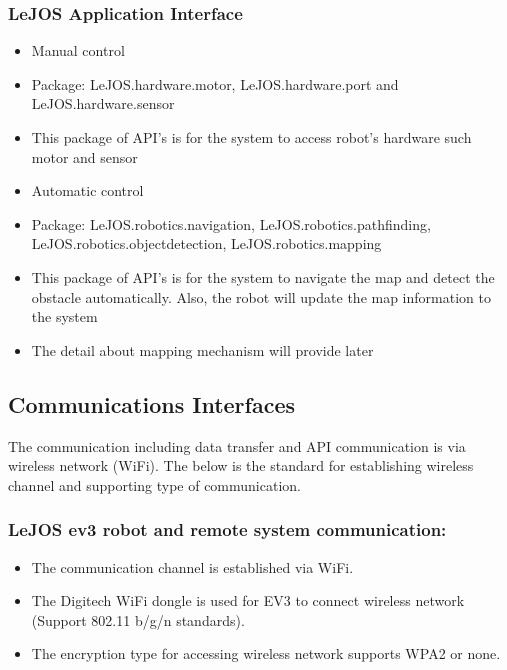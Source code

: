 \documentclass[10pt,a4paper,titlepage]{article}
\begin{document}
	\subsubsection*{LeJOS Application Interface}
	\begin{itemize}
		\item Manual control
		\item Package: LeJOS.hardware.motor, LeJOS.hardware.port and LeJOS.hardware.sensor
		\item This package of API's is for the system to access robot’s hardware such motor and sensor
		\item Automatic control
		\item Package: LeJOS.robotics.navigation, LeJOS.robotics.pathfinding, LeJOS.robotics.objectdetection, LeJOS.robotics.mapping
		\item This package of API's is for the system to navigate the map and detect the obstacle automatically. Also, the robot will update the map information to the system
		\item The detail about mapping mechanism will provide later
	\end{itemize} 
	
	\subsection{Communications Interfaces}
	The communication including data transfer and API communication is via wireless network (WiFi). The below is the standard for establishing wireless channel and supporting type of communication.
	
	\subsubsection*{LeJOS ev3 robot and remote system communication:}
	\begin{itemize}
		\item The communication channel is established via WiFi.
		\item The Digitech WiFi dongle is used for EV3 to connect wireless network (Support 802.11 b/g/n standards).
		\item The encryption type for accessing wireless network supports WPA2 or none.
	\end{itemize}
	
\end{document}
